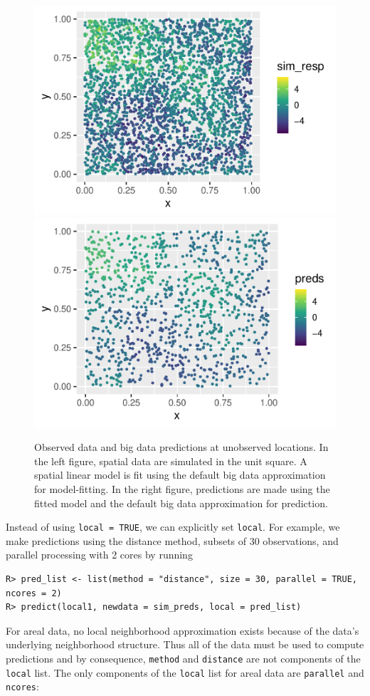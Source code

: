 \documentclass{article}
\begin{document}
\begin{figure}

{\centering \includegraphics[width=0.49\linewidth]{preprint_files/figure-latex/sim_preds-1} \includegraphics[width=0.49\linewidth]{preprint_files/figure-latex/sim_preds-2} 

}

\caption{Observed data and big data predictions at unobserved locations. In the left figure, spatial data are simulated in the unit square. A spatial linear model is fit using the default big data approximation for model-fitting. In the right figure, predictions are made using the fitted model and the default big data approximation for prediction.}\label{fig:sim_preds}
\end{figure}

Instead of using \texttt{local\ =\ TRUE}, we can explicitly set
\texttt{local}. For example, we make predictions using the distance
method, subsets of 30 observations, and parallel processing with 2 cores
by running

\begin{verbatim}
R> pred_list <- list(method = "distance", size = 30, parallel = TRUE, ncores = 2)
R> predict(local1, newdata = sim_preds, local = pred_list)
\end{verbatim}

For areal data, no local neighborhood approximation exists because of
the data's underlying neighborhood structure. Thus all of the data must
be used to compute predictions and by consequence, \texttt{method} and
\texttt{distance} are not components of the \texttt{local} list. The
only components of the \texttt{local} list for areal data are
\texttt{parallel} and \texttt{ncores}:
\end{document}

